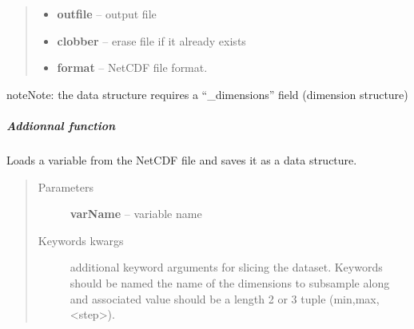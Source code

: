 \documentclass[letterpaper,10pt,english]{sphinxmanual}
\begin{document}
\begin{fulllineitems}
\begin{fulllineitems}
\begin{quote}
\begin{description}
\begin{itemize}
\item {} 
\textbf{outfile} -- output file

\item {} 
\textbf{clobber} -- erase file if it already exists

\item {} 
\textbf{format} -- NetCDF file format.

\end{itemize}

\end{description}\end{quote}

\begin{notice}{note}{Note:}
the data structure requires a ``\_dimensions'' field (dimension structure)
\end{notice}

\end{fulllineitems}


\end{fulllineitems}



\subparagraph{Addionnal function}
\label{altimetry.tools.nctools:addionnal-function}\label{altimetry.tools.nctools:load-ncvar}\label{altimetry.tools.nctools:module-altimetry.tools.nctools}

\begin{fulllineitems}
\label{altimetry.tools.nctools:altimetry.tools.nctools.load_ncVar}
Loads a variable from the NetCDF file and saves it as a data structure.
\begin{quote}\begin{description}
\item[{Parameters}] \leavevmode
\textbf{varName} -- variable name

\item[{Keywords kwargs}] \leavevmode
additional keyword arguments for slicing the dataset. Keywords should be named the name of the dimensions to subsample along and associated value should be a length 2 or 3 tuple (min,max,\textless{}step\textgreater{}).

\end{description}\end{quote}

\end{fulllineitems}
\end{document}

